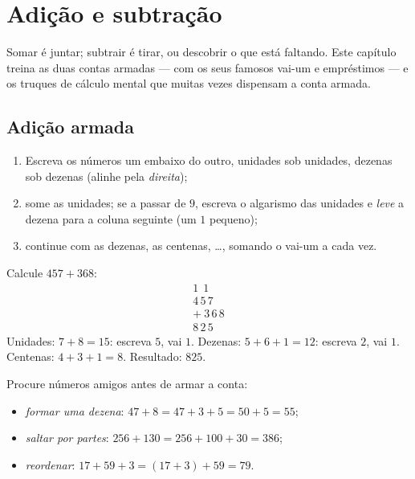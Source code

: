 \chapter{Adição e subtração}\label{ch:g3:addsub}

Somar é juntar; subtrair é tirar, ou descobrir o que está faltando.
Este capítulo treina as duas contas armadas --- com os seus famosos
vai-um e empréstimos --- e os truques de cálculo mental que muitas
vezes dispensam a conta armada.

\section{Adição armada}

\begin{method}\label{met:g3:addsub:add}
\begin{enumerate}
  \item Escreva os números um embaixo do outro, unidades sob
        unidades, dezenas sob dezenas (alinhe pela \emph{direita});
  \item some as unidades; se a  passar de $9$, escreva o
        algarismo das unidades e \emph{leve} a dezena para a coluna
        seguinte (um $1$ pequeno);
  \item continue com as dezenas, as centenas, \dots, somando o
        vai-um a cada vez.
\end{enumerate}
\end{method}

\begin{example}\label{ex:g3:addsub:add}
Calcule $457 + 368$:
\[
\begin{array}{r}
{\scriptstyle 1}\ \ {\scriptstyle 1}\ \ \phantom{0} \\[-3pt]
4\,5\,7 \\
+\ 3\,6\,8 \\
\hline
8\,2\,5
\end{array}
\]
Unidades: $7 + 8 = 15$: escreva $5$, vai $1$. Dezenas:
$5 + 6 + 1 = 12$: escreva $2$, vai $1$. Centenas: $4 + 3 + 1 = 8$.
Resultado: $825$.
\end{example}

\begin{example}\label{ex:g3:addsub:mental}
Procure números amigos antes de armar a conta:
\begin{itemize}
  \item \emph{formar uma dezena}: $47 + 8 = 47 + 3 + 5 = 50 + 5 =
        55$;
  \item \emph{saltar por partes}: $256 + 130 = 256 + 100 + 30 = 386$;
  \item \emph{reordenar}: $17 + 59 + 3 = (17 + 3) + 59 = 79$.
\end{itemize}
\end{example}

